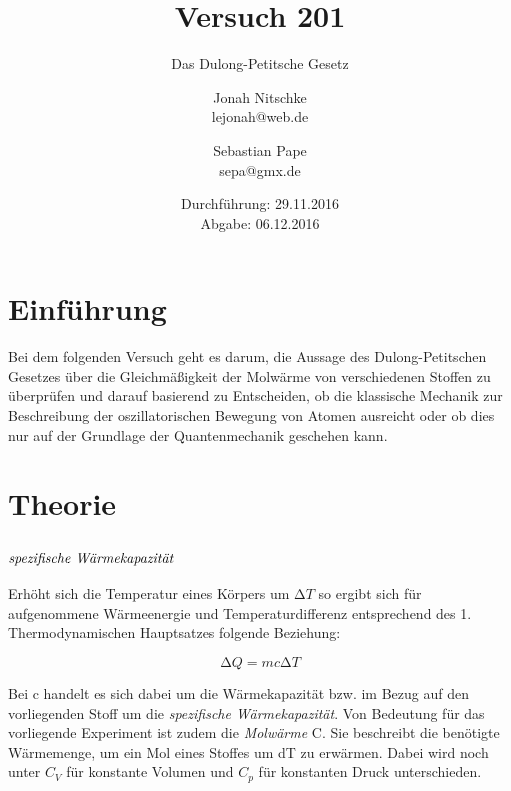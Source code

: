 

\title{Versuch 201}
\subtitle{Das Dulong-Petitsche Gesetz}
\author{Jonah Nitschke\\
        lejonah@web.de \and
        Sebastian Pape\\
        sepa@gmx.de}
\date{Durchführung: 29.11.2016\\
      Abgabe: 06.12.2016}



\maketitle
\tableofcontents
\newpage

\section{Einführung}
Bei dem folgenden Versuch geht es darum, die Aussage des Dulong-Petitschen Gesetzes
über die Gleichmäßigkeit der Molwärme von verschiedenen Stoffen zu überprüfen und
darauf basierend zu Entscheiden, ob die klassische Mechanik zur Beschreibung
der oszillatorischen Bewegung von Atomen ausreicht oder ob dies nur auf der
Grundlage der Quantenmechanik geschehen kann.

\section{Theorie}

\subsection{\texorpdfstring{$\emph{spezifische Wärmekapazität}$}{z}}

Erhöht sich die Temperatur eines Körpers um $\increment T$ so ergibt sich
für aufgenommene Wärmeenergie und Temperaturdifferenz entsprechend
des 1. Thermodynamischen Hauptsatzes folgende Beziehung:

\begin{equation}
  \increment Q = m c \increment T
\end{equation}

Bei c handelt es sich dabei um die Wärmekapazität bzw. im Bezug auf den
vorliegenden Stoff um die \emph{spezifische Wärmekapazität}. Von
Bedeutung für das vorliegende Experiment ist zudem die \emph{Molwärme} C.
Sie beschreibt die benötigte Wärmemenge, um ein Mol eines Stoffes um dT zu
erwärmen. Dabei wird noch unter $C_V$ für konstante Volumen und $C_p$ für
konstanten Druck unterschieden.

